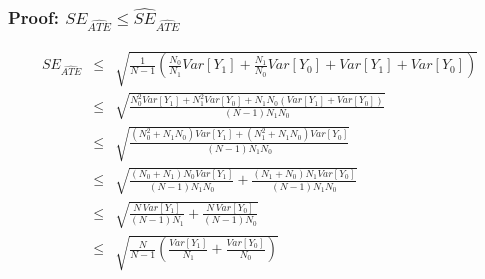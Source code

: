 \documentclass{beamer}
\numberwithin{equation}{section}
\begin{document}
\begin{frame}
  \frametitle{Proof: $SE_{\widehat{ATE}}\leq \widehat{SE}_{\widehat{ATE}}$}
\scriptsize

\begin{eqnarray*}
  SE_{\widehat{ATE}} & \leq &\sqrt{\frac{1}{N-1}\left( \frac{N_0}{N_1}Var[Y_1]+\frac{N_1}{N_0}Var[Y_0]  + Var[Y_1]+Var[Y_0]\right)} \\
  & \leq & \sqrt{ \frac{N_0^2Var[Y_1]+N_1^2 Var[Y_0] + N_1 N_0 (Var[Y_1]+Var[Y_0])}{(N-1)N_1 N_0}} \\
  & \leq & \sqrt{ \frac{(N_0^2 + N_1 N_0) Var[Y_1]+(N_1^2 + N_1 N_0) Var[Y_0] }{(N-1)N_1 N_0}} \\
    & \leq & \sqrt{ \frac{(N_0 + N_1) N_0 Var[Y_1]}{(N-1) N_1 N_0}+ \frac{ (N_1 + N_0) N_1  Var[Y_0]}{(N-1)N_1 N_0}}  \\
    & \leq & \sqrt{ \frac{N \,  Var[Y_1]}{(N-1) N_1 }+ \frac{ N \, Var[Y_0]}{(N-1) N_0}}  \\
    & \leq & \sqrt{\frac{N}{N-1} \left(\frac{Var[Y_1]}{N_1}+ \frac{ Var[Y_0]}{N_0}\right)}  \\
\end{eqnarray*}


\end{frame}
\end{document}
